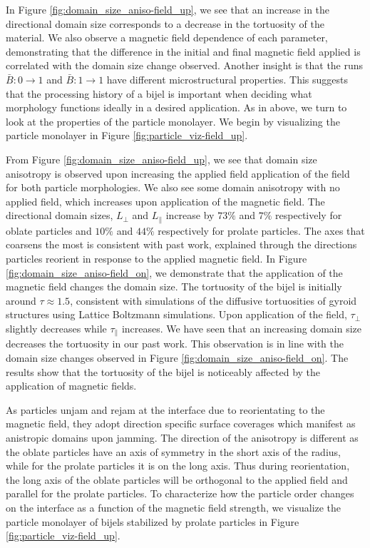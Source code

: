 In Figure \ref{fig:domain_size_aniso-field_up}, we see that an increase
in the directional domain size corresponds to a decrease in the
tortuosity of the material. We also observe a magnetic field dependence
of each parameter, demonstrating that the difference in the initial and
final magnetic field applied is correlated with the domain size change
observed. Another insight is that the runs \(\bar{B}: 0 \rightarrow 1\)
and \(\bar{B}: 1 \rightarrow 1\) have different microstructural
properties. This suggests that the processing history of a bijel is
important when deciding what morphology functions ideally in a desired
application. As in above, we turn to look at the properties of the
particle monolayer. We begin by visualizing the particle monolayer in
Figure \ref{fig:particle_viz-field_up}.

From Figure \ref{fig:domain_size_aniso-field_up}, we see that domain
size anisotropy is observed upon increasing the applied field
application of the field for both particle morphologies. We also see
some domain anisotropy with no applied field, which increases upon
application of the magnetic field. The directional domain sizes,
\(L_{\perp}\) and \(L_{\parallel}\) increase by \(73\%\) and \(7\%\)
respectively for oblate particles and \(10\%\) and \(44\%\) respectively
for prolate particles. The axes that coarsens the most is consistent
with past work, explained through the directions particles reorient in
response to the applied magnetic field. In Figure
\ref{fig:domain_size_aniso-field_on}, we demonstrate that the
application of the magnetic field changes the domain size. The
tortuosity of the bijel is initially around \(\tau \approx 1.5\),
consistent with simulations of the diffusive tortuosities of gyroid
structures using Lattice Boltzmann simulations.
\cite{luo_macroscopic_2020} Upon application of the field,
\(\tau_{\perp}\) slightly decreases while \(\tau_{\parallel}\)
increases. We have seen that an increasing domain size decreases the
tortuosity in our past work. \cite{karthikeyan_formation_2024} This
observation is in line with the domain size changes observed in Figure
\ref{fig:domain_size_aniso-field_on}. The results show that the
tortuosity of the bijel is noticeably affected by the application of
magnetic fields.

As particles unjam and rejam at the interface due to reorientating to
the magnetic field, they adopt direction specific surface coverages
which manifest as anistropic domains upon jamming. The direction of the
anisotropy is different as the oblate particles have an axis of symmetry
in the short axis of the radius, while for the prolate particles it is
on the long axis. Thus during reorientation, the long axis of the oblate
particles will be orthogonal to the applied field and parallel for the
prolate particles. To characterize how the particle order changes on the
interface as a function of the magnetic field strength, we visualize the
particle monolayer of bijels stabilized by prolate particles in Figure
\ref{fig:particle_viz-field_up}.

